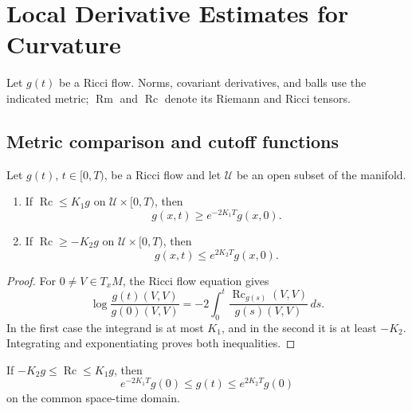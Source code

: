 \chapter[14]{Local Derivative Estimates for Curvature}
\label{ch:chow-ii-local-derivative-estimates}

Let \(g(t)\) be a Ricci flow.  Norms, covariant derivatives, and balls use
the indicated metric; \(\operatorname{Rm}\) and \(\operatorname{Rc}\) denote
its Riemann and Ricci tensors.

\section{Metric comparison and cutoff functions}

\begin{lemma}
\label{lem:chow-ii-ricci-bounds-metric-comparison}

Let \(g(t)\), \(t\in[0,T)\), be a Ricci flow and let \(\mathcal U\) be an
open subset of the manifold.
\begin{enumerate}
\item If \(\operatorname{Rc}\le K_1g\) on \(\mathcal U\times[0,T)\), then
\[
g(x,t)\ge e^{-2K_1T}g(x,0).
\]
\item If \(\operatorname{Rc}\ge-K_2g\) on \(\mathcal U\times[0,T)\), then
\[
g(x,t)\le e^{2K_2T}g(x,0).
\]
\end{enumerate}
\end{lemma}
\begin{proof}
\sketch For \(0\ne V\in T_xM\), the Ricci flow equation gives
\[
\log\frac{g(t)(V,V)}{g(0)(V,V)}
=-2\int_0^t\frac{\operatorname{Rc}_{g(s)}(V,V)}{g(s)(V,V)}\,ds.
\]
In the first case the integrand is at most \(K_1\), and in the second it is
at least \(-K_2\).  Integrating and exponentiating proves both inequalities.
\end{proof}

\begin{remark}
\label{rem:chow-ii-uniform-metric-equivalence}


If \(-K_2g\le\operatorname{Rc}\le K_1g\), then
\[
e^{-2K_1T}g(0)\le g(t)\le e^{2K_2T}g(0)
\]
on the common space-time domain.
\end{remark}

